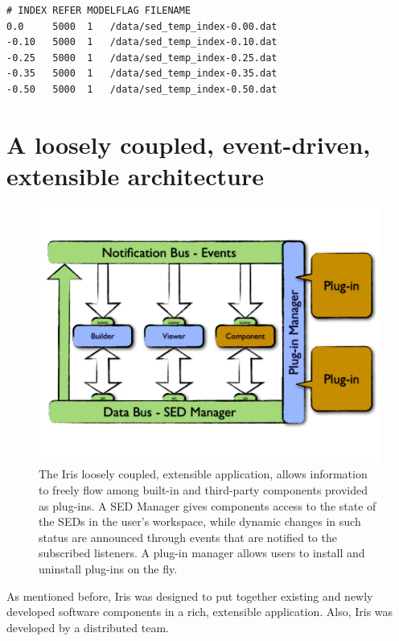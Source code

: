 \documentclass[5p]{elsarticle}
\begin{document}
\begin{lstlisting}[style=code,
	caption=Example of template library definition file,
	label=lst:templateconfig]
# INDEX REFER MODELFLAG FILENAME
0.0     5000  1   /data/sed_temp_index-0.00.dat
-0.10   5000  1   /data/sed_temp_index-0.10.dat
-0.25   5000  1   /data/sed_temp_index-0.25.dat
-0.35   5000  1   /data/sed_temp_index-0.35.dat
-0.50   5000  1   /data/sed_temp_index-0.50.dat
\end{lstlisting}


\section{A loosely coupled, event-driven, extensible architecture}
\label{sec:architecture}

\begin{figure}
\begin{center}
\includegraphics[width=\columnwidth]{figures/IrisDiagrams.1.png}
\caption{The Iris loosely coupled, extensible application, allows information to freely flow among built-in and third-party components provided as plug-ins. A SED Manager gives components access to the state of the SEDs in the user's workspace, while dynamic changes in such status are announced through events that are notified to the subscribed listeners. A plug-in manager allows users to install and uninstall plug-ins on the fly.}
\end{center}
\end{figure}

As mentioned before, Iris was designed to put together existing and newly developed software components in a rich, extensible application. Also, Iris was developed by a distributed team.
\end{document}
